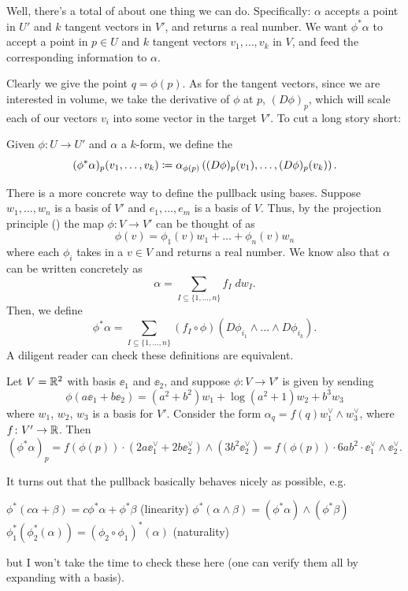 Well, there's a total of about one thing we can do.
Specifically: $\alpha$ accepts a point in $U'$ and $k$ tangent vectors in $V'$,
and returns a real number.
We want $\phi^\ast \alpha$ to accept a point in $p \in U$
and $k$ tangent vectors $v_1, \dots, v_k$ in $V$,
and feed the corresponding information to $\alpha$.

Clearly we give the point $q = \phi(p)$.
As for the tangent vectors, since we are interested in volume, we take the
derivative of $\phi$ at $p$, $(D\phi)_p$, which will scale each of our vectors $v_i$
into some vector in the target $V'$.
To cut a long story short:
\begin{definition}
	Given $\phi \colon U \to U'$ and $\alpha$ a $k$-form, we define the 
	\[
		(\phi^\ast \alpha)_p(v_1, \dots, v_k)
		\coloneqq \alpha_{\phi(p)}
		\left( (D\phi)_p(v_1), \dots, (D\phi)_p(v_k) \right).
	\]
\end{definition}

There is a more concrete way to define the pullback using bases.
Suppose $w_1, \dots, w_n$ is a basis of $V'$
and $e_1, \dots, e_m$ is a basis of $V$.
Thus, by the projection principle ()
the map $\phi \colon V \to V'$ can be thought of as
\[ \phi(v) = \phi_1(v) w_1 + \dots + \phi_n(v) w_n \]
where each $\phi_i$ takes in a $v \in V$ and returns a real number.
We know also that $\alpha$ can be written concretely as
\[ \alpha = \sum_{I \subseteq \{1, \dots, n\}} f_I \; dw_I. \]
Then, we define
\[
	\phi^\ast\alpha
	= \sum_{I \subseteq \{1, \dots, n\}}
	(f_I \circ \phi) (D\phi_{i_1} \wedge \dots \wedge D\phi_{i_k}).
\]
A diligent reader can check these definitions are equivalent.
\begin{example}
	Let $V = \mathbb R^2$ with basis $\ee_1$ and $\ee_2$,
	and suppose $\phi \colon V \to V'$ is given by sending
	\[ \phi(a\ee_1 + b\ee_2) = (a^2+b^2)w_1 + \log(a^2+1) w_2 + b^3 w_3 \]
	where $w_1$, $w_2$, $w_3$ is a basis for $V'$.
	Consider the form $\alpha_q = f(q) w_1^\vee \wedge w_3^\vee$, where $f \colon V' \to \mathbb R$.
	Then
	\[ (\phi^\ast\alpha)_p = f(\phi(p)) \cdot (2a \ee_1^\vee + 2b\ee_2^\vee) \wedge (3b^2 \ee_2^\vee)
		= f(\phi(p)) \cdot 6ab^2 \cdot \ee_1^\vee \wedge \ee_2^\vee. \]
\end{example}

It turns out that the pullback basically behaves nicely as possible, e.g.\
\begin{itemize}
	\ii $\phi^\ast(c\alpha + \beta) = c\phi^\ast \alpha + \phi^\ast\beta$ (linearity)
	\ii $\phi^\ast(\alpha\wedge\beta)
	= (\phi^\ast \alpha)\wedge(\phi^\ast \beta)$
	\ii $\phi_1^\ast(\phi_2^\ast(\alpha))
	= (\phi_2 \circ \phi_1)^\ast(\alpha)$ (naturality)
\end{itemize}
but I won't take the time to check these here
(one can verify them all by expanding with a basis).


